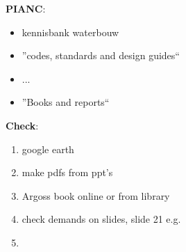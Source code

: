 \textbf{PIANC}:
\begin{itemize}
 \item kennisbank waterbouw
 \item ''codes, standards and design guides``
 \item ...
 \item ''Books and reports``
\end{itemize}


\textbf{Check}:
\begin{enumerate}
 \item google earth
 \item make pdfs from ppt's
 \item Argoss book online or from library
 \item check demands on slides, slide 21  e.g.
 \item 
\end{enumerate}


